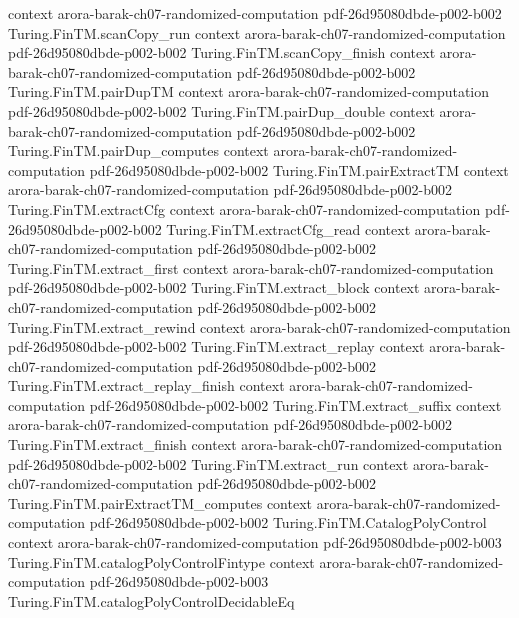 \begin{theorem}
  {context}
  {arora-barak-ch07-randomized-computation}
  {pdf-26d95080dbde-p002-b002}
\proofstep
  {Turing.FinTM.scanCopy_run}
  {context}
  {arora-barak-ch07-randomized-computation}
  {pdf-26d95080dbde-p002-b002}
\proofstep
  {Turing.FinTM.scanCopy_finish}
  {context}
  {arora-barak-ch07-randomized-computation}
  {pdf-26d95080dbde-p002-b002}
\proofstep
  {Turing.FinTM.pairDupTM}
  {context}
  {arora-barak-ch07-randomized-computation}
  {pdf-26d95080dbde-p002-b002}
\proofstep
  {Turing.FinTM.pairDup_double}
  {context}
  {arora-barak-ch07-randomized-computation}
  {pdf-26d95080dbde-p002-b002}
\proofstep
  {Turing.FinTM.pairDup_computes}
  {context}
  {arora-barak-ch07-randomized-computation}
  {pdf-26d95080dbde-p002-b002}
\proofstep
  {Turing.FinTM.pairExtractTM}
  {context}
  {arora-barak-ch07-randomized-computation}
  {pdf-26d95080dbde-p002-b002}
\proofstep
  {Turing.FinTM.extractCfg}
  {context}
  {arora-barak-ch07-randomized-computation}
  {pdf-26d95080dbde-p002-b002}
\proofstep
  {Turing.FinTM.extractCfg_read}
  {context}
  {arora-barak-ch07-randomized-computation}
  {pdf-26d95080dbde-p002-b002}
\proofstep
  {Turing.FinTM.extract_first}
  {context}
  {arora-barak-ch07-randomized-computation}
  {pdf-26d95080dbde-p002-b002}
\proofstep
  {Turing.FinTM.extract_block}
  {context}
  {arora-barak-ch07-randomized-computation}
  {pdf-26d95080dbde-p002-b002}
\proofstep
  {Turing.FinTM.extract_rewind}
  {context}
  {arora-barak-ch07-randomized-computation}
  {pdf-26d95080dbde-p002-b002}
\proofstep
  {Turing.FinTM.extract_replay}
  {context}
  {arora-barak-ch07-randomized-computation}
  {pdf-26d95080dbde-p002-b002}
\proofstep
  {Turing.FinTM.extract_replay_finish}
  {context}
  {arora-barak-ch07-randomized-computation}
  {pdf-26d95080dbde-p002-b002}
\proofstep
  {Turing.FinTM.extract_suffix}
  {context}
  {arora-barak-ch07-randomized-computation}
  {pdf-26d95080dbde-p002-b002}
\proofstep
  {Turing.FinTM.extract_finish}
  {context}
  {arora-barak-ch07-randomized-computation}
  {pdf-26d95080dbde-p002-b002}
\proofstep
  {Turing.FinTM.extract_run}
  {context}
  {arora-barak-ch07-randomized-computation}
  {pdf-26d95080dbde-p002-b002}
\proofstep
  {Turing.FinTM.pairExtractTM_computes}
  {context}
  {arora-barak-ch07-randomized-computation}
  {pdf-26d95080dbde-p002-b002}
\proofstep
  {Turing.FinTM.CatalogPolyControl}
  {context}
  {arora-barak-ch07-randomized-computation}
  {pdf-26d95080dbde-p002-b003}
\proofstep
  {Turing.FinTM.catalogPolyControlFintype}
  {context}
  {arora-barak-ch07-randomized-computation}
  {pdf-26d95080dbde-p002-b003}
\proofstep
  {Turing.FinTM.catalogPolyControlDecidableEq}

\end{theorem}
